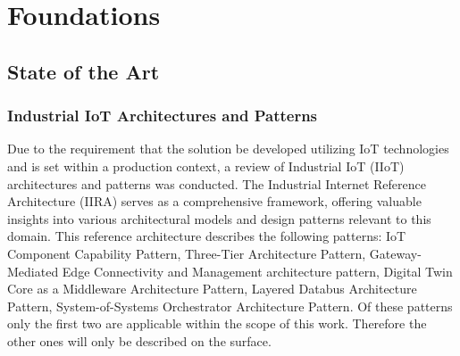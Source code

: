 \clearpage
\chapter{\textbf{Foundations}}\label{grundlagen}

\section{State of the Art}\label{unterkapitel}
\subsection{Industrial IoT Architectures and Patterns}
Due to the requirement that the solution be developed utilizing IoT technologies and is set within a production context, a review of Industrial IoT (IIoT) architectures and patterns was conducted. The Industrial Internet Reference Architecture (IIRA) \cite{IIRA} serves as a comprehensive framework, offering valuable insights into various architectural models and design patterns relevant to this domain. This reference architecture describes the following patterns: IoT Component Capability Pattern, Three-Tier Architecture Pattern, Gateway-Mediated Edge Connectivity and Management architecture pattern, Digital Twin Core as a Middleware Architecture Pattern, Layered Databus Architecture Pattern, System-of-Systems Orchestrator Architecture Pattern. Of these patterns only the first two are applicable within the scope of this work. Therefore the other ones will only be described on the surface.



